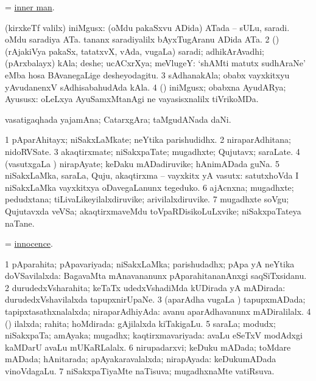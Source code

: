 \bentry
{}
\gl{\nA}
\bmng
= \hyperlink{inner man}{inner man}. 
\emng
\eentry

\bentry
{}
\gl{\nA}
\bmng
\bnum
{} (kirxkeTf \mo valilx) iniMgusx: 
\banum
{} (oMdu pakaSxvu ADida) ATada -- sULu, saradi. 
 oMdu saradiya ATa. 
 tananx saradiyalilx bAyxTugAranu ADida ATa. 
\eanum
\numie
\num{2} (\rUpa) (rAjakiVya pakaSx, tatatxvX, vAda, \mo vugaLa) saradi; adhikArAvadhi; (pArxbalayx) kAla; deshe; ucACxrXya; meVlugeY:  `shAMti matutx sudhAraNe' eMba hosa BAvanegaLige desheyodagitu. 
\num{3} sAdhanakAla; obabx vayxkitxyu yAvudanenxV sAdhisabahudAda kAla. 
\num{4} (\AmA) iniMgusx; obabxna AyudARya; Ayususx:  oLeLxya AyuSamxMtanAgi ne vayasisxnalilx tiVrikoMDa. 
\enum
\emng
\eentry

\bentry
{}
\gl{\nA}
\bmng
vasatigaqhada yajamAna; CatarxgAra; taMgudANada daNi. 
\emng
\eentry

\bentry
{}
\gl{\nA}
\bmng
\bnum
\num{1} pAparAhitayx; niSakxLaMkate; neYtika parishudidhx. 
\num{2} niraparAdhitana; nidoRVSate. 
\num{3} akaqtirxmate; niSakxpaTate; mugadhxte; Qujutavx; saraLate. 
\num{4} (vasutxgaLa \vi) nirapAyate; keDaku mADadiruvike; hAnimADada guNa. 
\num{5} niSakxLaMka, saraLa, Quju, akaqtirxma -- vayxkitx yA vasutx:  satutxhoVda I niSakxLaMka vayxkitxya oDavegaLanunx tegeduko. 
\num{6} ajAcnxna; mugadhxte; pedudxtana; tiLivaLikeyilalxdiruvike; arivilalxdiruvike. 
\num{7} mugadhxte soVgu; Qujutavxda veVSa; akaqtirxmaveMdu toVpaRDisikoLuLxvike; niSakxpaTateya naTane. 
\enum
\emng
\eentry

\bentry
{}
\gl{\nA}
\bmng
= \hyperlink{innocence}{innocence}. 
\emng
\eentry

\bentry
{}
\gl{\gu}
\bmng
\bnum
\num{1} pAparahita; pApavariyada; niSakxLaMka; parishudadhx; pApa yA neYtika doVSavilalxda:  BagavaMta mAnavananunx pAparahitananAnxgi saqSiTxsidanu. 
\num{2} durudedxVsharahita; keTaTx udedxVshadiMda kUDirada yA mADirada:  durudedxVshavilalxda tapupxnirUpaNe. 
\num{3} (aparAdha \mo vugaLa \vi) tapupxmADada; tapipxtasathxnalalxda; niraparAdhiyAda:  avanu aparAdhavanunx mADiralilalx. 
\num{4} (\AmA) ilalxda; rahita; hoMdirada:  gAjilalxda kiTakigaLu. 
\num{5} saraLa; modudx; niSakxpaTa; amAyaka; mugadhx; kaqtirxmavariyada:  avaLu eSeTxV modAdxgi kaMDarU avaLu mUKaRLalalx. 
\num{6} nirupadarxvi; keDuku mADada; toMdare mADada; hAnitarada; apAyakaravalalxda; nirapAyada:  keDukumADada vinoVdagaLu. 
\num{7} niSakxpaTiyaMte naTisuva; mugadhxnaMte vatiRsuva. 
\enum
\emng
\eentry

